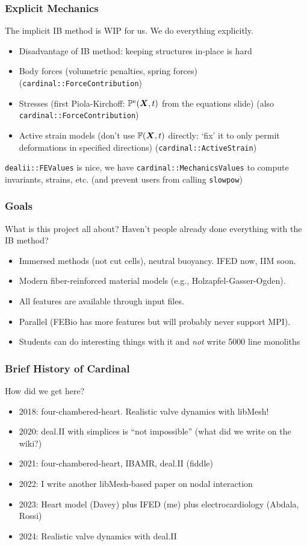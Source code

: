 \documentclass[8pt]{beamer}
\begin{document}
\begin{frame}
    \frametitle{Explicit Mechanics} The implicit IB method is WIP for us. We
    do everything explicitly.

    \begin{itemize}
      \item Disadvantage of IB method: keeping structures in-place is hard
      \item Body forces (volumetric penalties, spring forces) (\texttt{cardinal::ForceContribution})
      \item Stresses (first Piola-Kirchoff: $\mathbb{P}^{\text{e}}(\boldsymbol{X},t)$ from the equations
        slide) (also \texttt{cardinal::ForceContribution})
      \item Active strain models (don't use $\mathbb{F}(\boldsymbol{X},t)$ directly: `fix' it to
        only permit deformations in specified directions) (\texttt{cardinal::ActiveStrain})
    \end{itemize}

    \texttt{dealii::FEValues} is nice, we have \texttt{cardinal::MechanicsValues} to compute
    invariants, strains, etc. (and prevent users from calling \texttt{slowpow})
\end{frame}

\begin{frame}
    \frametitle{Goals}
    What is this project all about? Haven't people already done everything with the IB method?
    \begin{itemize}
      \item Immersed methods (not cut cells), neutral buoyancy. IFED now, IIM soon.
      \item Modern fiber-reinforced material models (e.g., Holzapfel-Gasser-Ogden).
      \item All features are available through input files.
      \item Parallel (FEBio has more features but will probably never support MPI).
      \item Students can do interesting things with it and \emph{not} write 5000 line monoliths
    \end{itemize}
\end{frame}

\begin{frame}
    \frametitle{Brief History of Cardinal}
    How did we get here?
    \begin{itemize}
      \item 2018: four-chambered-heart. Realistic valve dynamics with libMesh!
      \item 2020: deal.II with simplices is ``not impossible'' (what did we write on the wiki?)
      \item 2021: four-chambered-heart, IBAMR, deal.II (fiddle)
      \item 2022: I write another libMesh-based paper on nodal interaction
      \item 2023: Heart model (Davey) plus IFED (me) plus electrocardiology (Abdala, Rossi)
      \item 2024: Realistic valve dynamics with deal.II
    \end{itemize}
\end{frame}
\end{document}
